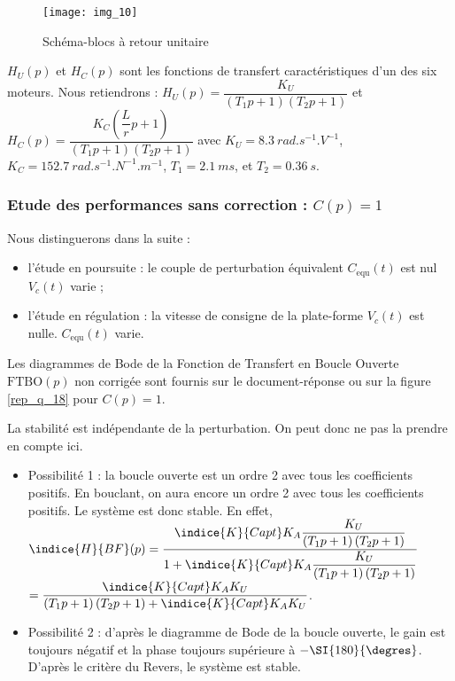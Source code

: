 \begin{figure}[H]
\centering
\texttt{[image: img\_10]}
\caption{Schéma-blocs à retour unitaire\label{img:10}}
\end{figure}

$H_U( p)$ et $H_C( p)$ sont les fonctions de transfert caractéristiques d’un des six moteurs. Nous retiendrons :
$H_U(p)=\dfrac{K_U}{\left(T_1p +1\right)\left(T_2p +1\right)}$ et $H_C(p)=\dfrac{K_C\left(\dfrac{L}{r}p +1\right)}{\left(T_1p +1\right)\left(T_2p +1\right)}$
avec 
$K_U = \SI{8,3}{rad . s ^{-1}.V ^{-1}}$, 
$K_C = \SI{152,7}{rad . s^{-1}.N^{-1} .m^{-1}}$, 
$T_1=\SI{2,1}{ms}$, 
et $T_2 =\SI{0,36}{s}$.
\fi

\subsubsection{Etude des performances sans correction : $C( p) =1$}
\ifprof
\else
Nous distinguerons dans la suite :
\begin{itemize}
\item l’étude en poursuite : le couple de perturbation équivalent $C_{\text{equ}} (t)$ est nul $V_c (t)$ varie ;
\item l’étude en régulation : la vitesse de consigne de la plate-forme $V_c (t)$ est nulle. $C_{\text{equ}}(t)$ varie.
\end{itemize}

Les diagrammes de Bode de la Fonction de Transfert en Boucle Ouverte $\text{FTBO}( p)$ non corrigée sont fournis sur le document-réponse ou sur la figure \ref{rep_q_18} pour $C( p) = 1$.
\fi

\ifprof
\begin{corrige}
La stabilité est indépendante de la perturbation. On peut donc ne pas la prendre en compte ici. 
\begin{itemize}
\item Possibilité 1 : la boucle ouverte est un ordre 2 avec tous les coefficients positifs. En bouclant, on aura encore un ordre 2 avec tous les coefficients positifs. Le système est donc stable. En effet, 
$\indice{H}{BF}(p)=\dfrac{\indice{K}{Capt}K_A\dfrac{K_U}{\left(T_1p +1\right)\left(T_2p +1\right)}}{1+\indice{K}{Capt}K_A\dfrac{K_U}{\left(T_1p +1\right)\left(T_2p +1\right)}}$
$=\dfrac{\indice{K}{Capt}K_AK_U}{\left(T_1p +1\right)\left(T_2p +1\right)+\indice{K}{Capt}K_AK_U}$.
\item Possibilité 2 : d'après le diagramme de Bode de la boucle ouverte, le gain est toujours négatif et la phase toujours supérieure à $-\SI{180}{\degres}$. D'après le critère du Revers, le système est stable.  
\end{itemize}
\end{corrige}
\else

